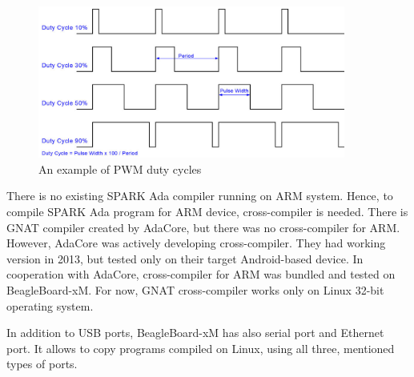 \begin{figure}[ht]%
    \begin{center}
      \includegraphics[width=0.9\textwidth]{figures/pwm.png}      
    \end{center}
    \caption{An example of PWM duty cycles}
    \label{figure:pwm}
\end{figure}

There is no existing SPARK Ada compiler running on ARM system. Hence, to compile SPARK Ada program for ARM device, cross-compiler is needed. There is GNAT compiler \cite{Horn:Thesis} created by AdaCore, but there was no cross-compiler for ARM. However, AdaCore was actively developing cross-compiler. They had working version in 2013, but tested only on their target Android-based device. In cooperation with AdaCore, cross-compiler for ARM was bundled and tested on BeagleBoard-xM. For now, GNAT cross-compiler works only on Linux 32-bit operating system.

In addition to USB ports, BeagleBoard-xM has also serial port and Ethernet port. It allows to copy programs compiled on Linux, using all three, mentioned types of ports. 
